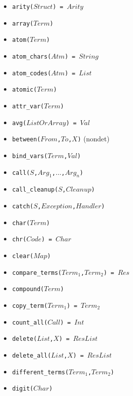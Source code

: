 \documentclass[10pt]{article}
\begin{document}
\begin{multicols}{2}
\begin{scriptsize}
\begin{itemize}
    \item \texttt{arity($Struct$) = $Arity$}
    \item \texttt{array($Term$)} 
    \item \texttt{atom($Term$)} 
    \item \texttt{atom\_chars($Atm$) = $String$}
    \item \texttt{atom\_codes($Atm$) = $List$} 
    \item \texttt{atomic($Term$)} 
    \item \texttt{attr\_var($Term$)} 
    \item \texttt{avg($ListOrArray$) = $Val$}
    \item \texttt{between($From$,$To$,$X$)} (nondet)
    \item \texttt{bind\_vars($Term$,$Val$)}
    \item \texttt{call($S$,$Arg_1$,$\ldots$,$Arg_n$)} 
    \item \texttt{call\_cleanup($S$,$Cleanup$)} 
    \item \texttt{catch($S$,$Exception$,$Handler$)} 
    \item \texttt{char($Term$)} 
    \item \texttt{chr($Code$) = $Char$} 
    \item \texttt{clear($Map$)} 
    \item \texttt{compare\_terms($Term_1$,$Term_2$) = $Res$} 
    \item \texttt{compound($Term$)} 
    \item \texttt{copy\_term($Term_1$) = $Term_2$}
    \item \texttt{count\_all($Call$) = $Int$}
    \item \texttt{delete($List$,$X$) = $ResList$}
    \item \texttt{delete\_all($List$,$X$) = $ResList$}
    \item \texttt{different\_terms($Term_1$,$Term_2$)}
    \item \texttt{digit($Char$)}

\end{itemize}
\end{scriptsize}
\end{multicols}
\end{document}
